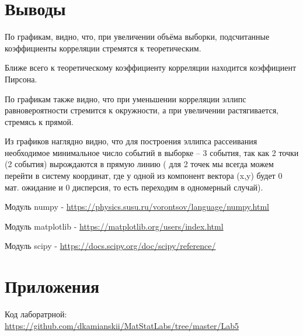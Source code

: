 \documentclass[a4]{article}
\begin{document}
\section{Выводы}
По графикам, видно, что, при увеличении объёма выборки, подсчитанные коэффициенты корреляции стремятся к теоретическим.

Ближе всего к теоретическому коэффициенту корреляции находится коэффициент Пирсона.

По графикам также видно, что при уменьшении корреляции эллипс равновероятности стремится к окружности, а при увеличении растягивается, стремясь к прямой.

Из графиков наглядно видно, что для построения эллипса рассеивания необходимое минимальное число событий в выборке -- 3 события, так как 2 точки (2 события) вырождаются в прямую линию ( для 2 точек мы всегда можем перейти в систему координат, где у одной из компонент вектора (x,y) будет 0 мат. ожидание и 0 дисперсия, то есть переходим в одномерный случай).

\begin{thebibliography}{}
      Модуль numpy  -  \url{https://physics.susu.ru/vorontsov/language/numpy.html}
    
    Модуль matplotlib - \url{https://matplotlib.org/users/index.html}
    
    Модуль scipy - \url{https://docs.scipy.org/doc/scipy/reference/}
    

\end{thebibliography}

\section{Приложения}


Код лаборатрной:\; \url{https://github.com/dkamianskii/MatStatLabs/tree/master/Lab5}
\end{document}
